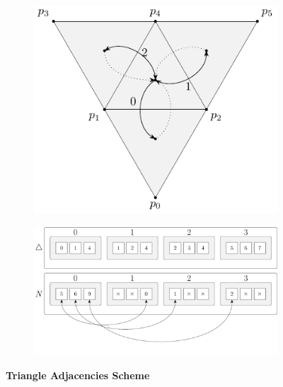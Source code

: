 \documentclass{stdlocal}
\begin{document}
  \begin{figure}[h]
    \centering
    \begin{subfigure}[c]{0.38\linewidth}
      \centering
      \includegraphics[width=\linewidth]{figures/polyhedral-surface-triangle-adjacencies.pdf}
    \end{subfigure}
    \hfill
    \begin{subfigure}[c]{0.60\linewidth}
      \centering
      \includegraphics[width=\linewidth]{figures/polyhedral-surface-triangle-adjacencies-struct.pdf}
    \end{subfigure}
    \caption[Triangle Adjacencies Scheme]{
      \textbf{Triangle Adjacencies Scheme}\\
    }
  \end{figure}
\end{document}
